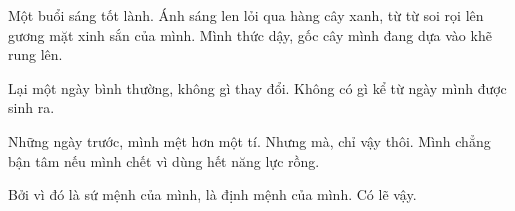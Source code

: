 

Một buổi sáng tốt lành. Ánh sáng len lỏi qua hàng cây xanh, từ từ soi rọi lên gương mặt xinh sắn của mình. Mình thức dậy, gốc cây mình đang dựa vào khẽ rung lên. 


Lại một ngày bình thường, không gì thay đổi. Không có gì kể từ ngày mình được sinh ra.



Những ngày trước, mình mệt hơn một tí. Nhưng mà, chỉ vậy thôi. Mình chẳng bận tâm nếu mình chết vì dùng hết năng lực rồng. 


Bởi vì đó là sứ mệnh của mình, là định mệnh của mình. Có lẽ vậy.


